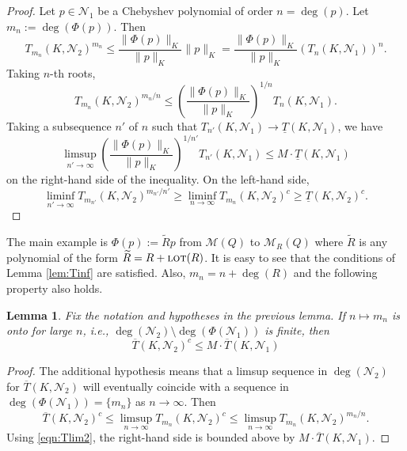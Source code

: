 \documentclass[12pt]{article}
\numberwithin{equation}{section}
\newtheorem{lemma}[theorem]{Lemma}
\renewcommand{\tilde}{\widetilde}
\newcommand{\calM}{\mathcal{M}}
\newcommand{\lot}{\text{\sc lot}}
\newcommand{\calN}{\mathcal{N}}
\begin{document}
\begin{proof}
Let $p\in\calN_1$ be a Chebyshev polynomial of order $n=\deg(p)$.  Let $m_n:=\deg(\Phi(p))$.  Then 
\begin{equation*}
T_{m_n}(K,\calN_2)^{m_n}  \leq \frac{\|\Phi(p)\|_K}{ \|p\|_K}    \|p\|_K = \frac{\|\Phi(p)\|_K}{ \|p\|_K} (T_n(K,\calN_1))^n.
\end{equation*}
Taking $n$-th roots, 
\begin{equation}\label{eqn:Tlim2}
T_{m_n}(K,\calN_2)^{m_n/n}\leq\left(\frac{\|\Phi(p)\|_K}{ \|p\|_K}\right)^{1/n} T_n(K,\calN_1).\end{equation} 
Taking a subsequence $n'$ of $n$   such that $T_{n'}(K,\calN_1)\to\underline T(K,\calN_1)$, we have  
$$\limsup_{n'\to\infty}\left(\frac{\|\Phi(p)\|_K}{ \|p\|_K}\right)^{1/n'}T_{n'}(K,\calN_1) \leq M\cdot \underline T(K,\calN_1)$$   on the right-hand side of the inequality.  On the left-hand side, 
$$\liminf_{n'\to\infty}T_{m_{n'}}(K,\calN_2)^{m_{n'}/n'}\geq \liminf_{n\to\infty}T_{m_n}(K,\calN_2)^c\geq \underline T(K,\calN_2)^c.  
$$ 
\end{proof}

The main example is $\Phi(p):=\tilde Rp$ from $\calM(Q)$ to $\calM_R(Q)$ where $\tilde R$ is any polynomial of the form $\tilde R=R+\lot(R)$. It is easy to see that the conditions of Lemma \ref{lem:Tinf} are satisfied.    Also, $m_n = n+\deg(R)$ and the following property also holds. 

\begin{lemma}\label{lem:Tsup}
Fix the notation and hypotheses in the previous lemma.     
 If  $n\mapsto m_n$ is onto for large $n$, i.e.,   
$\deg(\calN_2)\setminus\deg(\Phi(\calN_1))$ is finite,  then  
\begin{equation}\label{eqn:Tsup}
\overline T(K,\calN_2)^c \leq M\cdot \overline T(K,\calN_1)
\end{equation}
\end{lemma}

\begin{proof}
 The additional hypothesis means that a limsup sequence in $\deg(\calN_2)$ for $\overline T(K,\calN_2)$ will eventually coincide with a sequence in $\deg(\Phi(\calN_1))=\{m_n\}$ as $n\to\infty$.  Then 
$$\overline T(K,\calN_2)^c \leq \limsup_{n\to\infty}T_{m_n}(K,\calN_2)^c\leq \limsup_{n\to\infty}T_{m_n}(K,\calN_2)^{m_n/n}.$$
Using \eqref{eqn:Tlim2}, the right-hand side is bounded above by $M\cdot\overline T(K,\calN_1)$.  
\end{proof}
\end{document}
